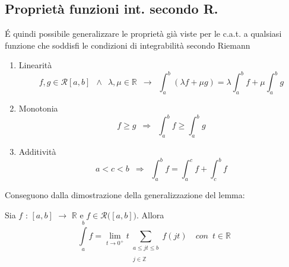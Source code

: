 \documentclass[10pt, oneside]{book}
\theoremstyle{plain}
\begin{document}
\subsection{Proprietà funzioni int. secondo R.}
\'E quindi possibile generalizzare le proprietà già viste per le c.a.t. a qualsiasi funzione che soddisfi le condizioni di integrabilità secondo Riemann
\begin{enumerate}
    \item Linearità
    \[f,g \in \mathcal{R}[a,b] \enspace \land \enspace \lambda, \mu \in \mathbb{R} \enspace \rightarrow \enspace \int_a^b (\lambda f + \mu g) = \lambda \int_a^b f + \mu \int_a^b g\]
    \item Monotonia
    \[f \geq g \enspace \Rightarrow \enspace \int_a^b f \geq \int_a^b g\]
    \item Additività
    \[a < c < b \enspace \Rightarrow \enspace \int_a^b f = \int_a^c f + \int_c^b f\]
\end{enumerate}
Conseguono dalla dimostrazione della generalizzazione del lemma:
\begin{lem}
    Sia $f$ : $[a,b]$ $\rightarrow$ $\mathbb{R}$ e $f \in \mathcal{R}\big([a,b]\big)$. Allora
    \[\int\limits_{a}^{b} f = \lim\limits_{t \rightarrow 0^+}^{} t \sum_{\substack{a \leq jt \leq b \\~\\ j \in \mathbb{Z}}} f(jt) \quad con \enspace t \in \mathbb{R}\]
\end{lem}
\end{document}
